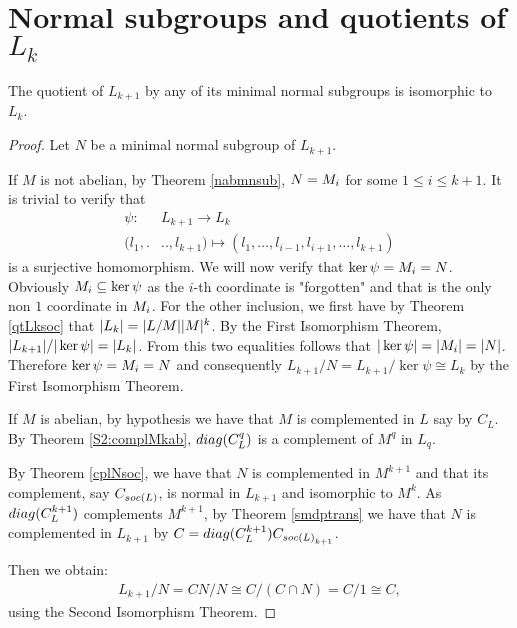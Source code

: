 \section{Normal subgroups and quotients of \texorpdfstring{$L_k$}{Lk}}

\begin{theorem}
    \label{S2:QLkmnsub}
    The quotient of $L_{k+1}$ by any of its minimal normal subgroups is isomorphic to $L_k$.
\end{theorem}

\begin{proof}
    Let $N$ be a minimal normal subgroup of $L_{k+1}$.

    If $M$ is not abelian, by Theorem \ref{nabmnsub}, $N = M_{i}$ for some $1 \le i \le k+1$. It is trivial to verify that
    \begin{align*}
        \psi \colon &L_{k+1} \longrightarrow L_k \\
                (l_1,.&..,l_{k+1}) \mapsto (l_1,\ldots ,l_{i-1},l_{i+1},\ldots ,l_{k+1})
    \end{align*}
    is a surjective homomorphism. We will now verify that $\ker \psi = M_{i} = N$. Obviously $M_{i} \subseteq \ker \psi$ as the $i$-th coordinate is "forgotten" and that is the only non $1$ coordinate in $M_{i}$. For the other inclusion, we first have by Theorem \ref{qtLksoc} that $| L_k | = | L/M | | M |^k$. By the First Isomorphism Theorem, $| L_{k+1} |/| \ker{\psi} | = | L_k |$. From this two equalities follows that $| \ker \psi | = | M_{i} | = | N |$. Therefore $\ker \psi = M_{i} = N$ and consequently
    $L_{k+1}/N = L_{k+1}/\ker \psi \cong L_k$ by the First Isomorphism Theorem.

    If $M$ is abelian, by hypothesis we have that $M$ is complemented in $L$ say by $C_L$. By Theorem \ref{S2:complMkab}, $diag({C_L^q})$ is a complement of $M^q$ in $L_q$.

    By Theorem \ref{cplNsoc}, we have that $N$ is complemented in $M^{k+1}$ and that its complement, say $C_{soc {(L)}}$, is normal in $L_{k+1}$ and isomorphic to $M^{k}$. 
    As $diag({C_L^{k+1}})$ complements $M^{k+1}$, by Theorem \ref{smdptrans} we have that $N$ is complemented in $L_{k+1}$ by $C=diag({C_L^{k+1}})C_{soc {(L)}_{k+1}}$.

    Then we obtain:
    \begin{align*}
        L_{k+1}/N = CN/N \cong C/(C \cap N) = C/1 \cong C,
    \end{align*}
    using the Second Isomorphism Theorem.


\end{proof}
